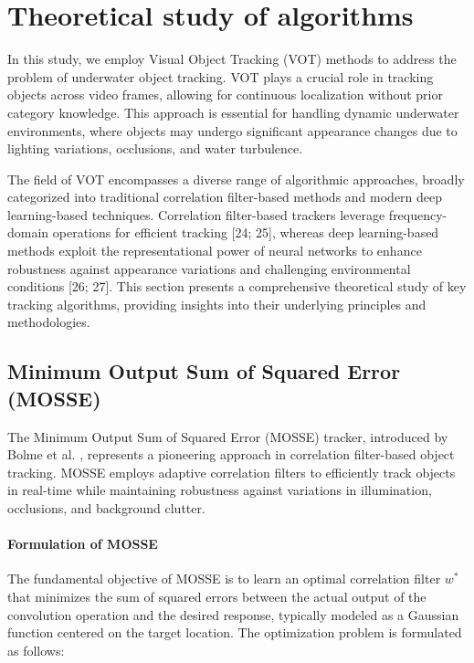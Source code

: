 \chapter{Theoretical study of algorithms}
\label{ch:fundamental}

In this study, we employ Visual Object Tracking (VOT) methods to address the problem of underwater object tracking. VOT plays a crucial role in tracking objects across video frames, allowing for continuous localization without prior category knowledge. This approach is essential for handling dynamic underwater environments, where objects may undergo significant appearance changes due to lighting variations, occlusions, and water turbulence.

The field of VOT encompasses a diverse range of algorithmic approaches, broadly categorized into traditional correlation filter-based methods and modern deep learning-based techniques. Correlation filter-based trackers leverage frequency-domain operations for efficient tracking [24; 25], whereas deep learning-based methods exploit the representational power of neural networks to enhance robustness against appearance variations and challenging environmental conditions [26; 27]. This section presents a comprehensive theoretical study of key tracking algorithms, providing insights into their underlying principles and methodologies.



\section{Minimum Output Sum of Squared Error (MOSSE)}
The Minimum Output Sum of Squared Error (MOSSE) tracker, introduced by Bolme et al. \cite{bolme2010visual}, represents a pioneering approach in correlation filter-based object tracking. MOSSE employs adaptive correlation filters to efficiently track objects in real-time while maintaining robustness against variations in illumination, occlusions, and background clutter.

\subsubsection{Formulation of MOSSE}
The fundamental objective of MOSSE is to learn an optimal correlation filter $w^*$ that minimizes the sum of squared errors between the actual output of the convolution operation and the desired response, typically modeled as a Gaussian function centered on the target location. The optimization problem is formulated as follows:

